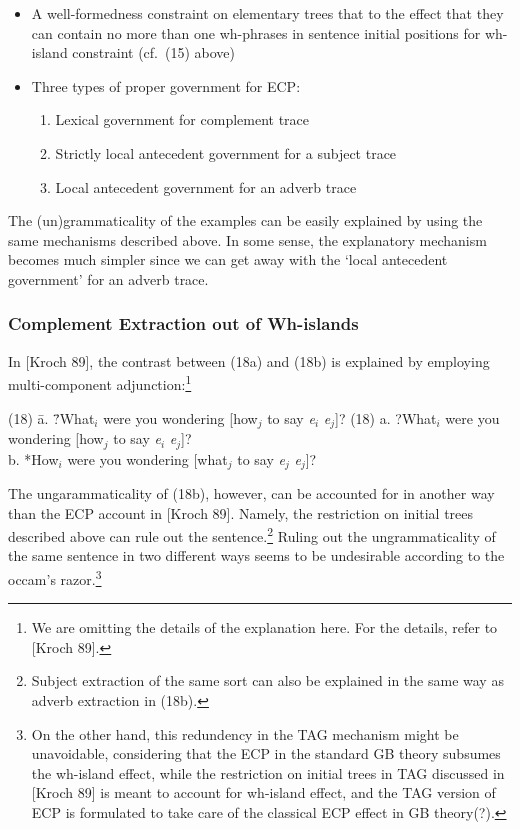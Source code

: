 \begin{itemize}
\item A well-formedness constraint on elementary trees that to the
effect that they can contain no more than one wh-phrases in sentence
initial positions for wh-island constraint (cf.\ (15) above)
\item Three types of proper government for ECP:
 \begin{enumerate}
  \item Lexical government for complement trace
  \item Strictly local antecedent government for a subject trace
  \item Local antecedent government for an adverb trace
 \end{enumerate}
\end{itemize}

The (un)grammaticality of the examples can be easily explained by
using the same mechanisms described above. In some sense, the
explanatory mechanism becomes much simpler since we can get away with
the `local antecedent government' for an adverb trace.

\subsubsection{Complement Extraction out of Wh-islands}

In [Kroch 89], the contrast between (18a) and (18b) is explained by
employing multi-component adjunction:\footnote{We are omitting the
details of the explanation here. For the details, refer to [Kroch
89].}

\begin{tabbing}
(18) \= a. \= ?What$_{i}$ were you wondering [how$_{j}$ to say {\em
e\/}$_{i}$ {\em e\/}$_{j}$]? \kill
(18) \> a. \> ?What$_{i}$ were you wondering [how$_{j}$ to say {\em
e\/}$_{i}$ {\em e\/}$_{j}$]? \\
     \> b. \> *How$_{i}$ were you wondering [what$_{j}$ to say {\em
e\/}$_{j}$ {\em e\/}$_{j}$]?
\end{tabbing}

\noindent
The ungarammaticality of (18b), however, can be accounted for in
another way than the ECP account in [Kroch 89]. Namely, the
restriction on initial trees described above can rule out the
sentence.\footnote{Subject extraction of the same sort can also be
explained in the same way as adverb extraction in (18b).} Ruling out
the ungrammaticality of the same sentence in two different ways seems
to be undesirable according to the occam's razor.\footnote{On the
other hand, this redundency in the TAG mechanism might be unavoidable, 
considering that the ECP in the standard GB theory
subsumes the wh-island effect, while the restriction on
initial trees in TAG discussed in [Kroch 89] is meant to account for
wh-island effect, and the TAG version of ECP is formulated to take
care of the classical ECP effect in GB theory(?).}

